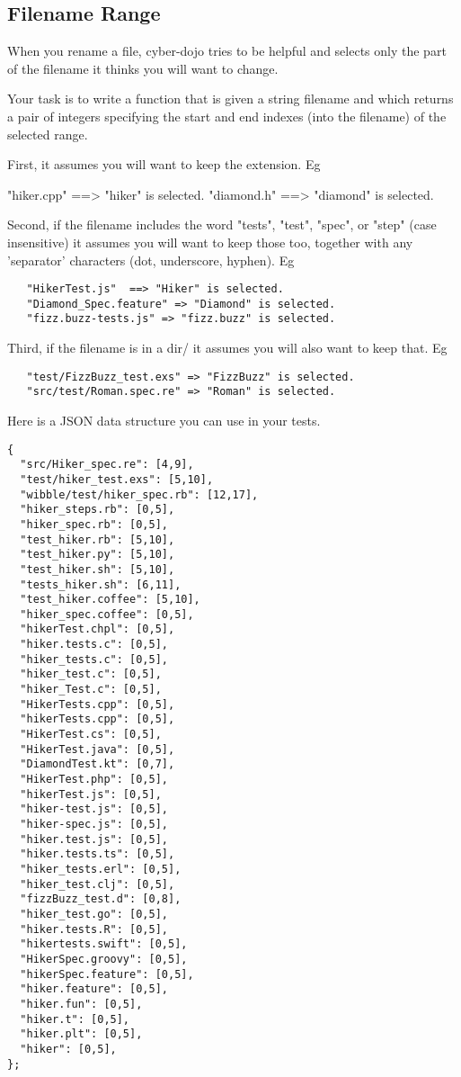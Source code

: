 \subsection{Filename Range}
When you rename a file, cyber-dojo tries to be helpful and selects only the part of the filename it thinks you will want to change.

Your task is to write a function that is given a string filename and which returns a pair of integers specifying the start and end indexes (into the filename) of the selected range.

First, it assumes you will want to keep the extension.
Eg

   "hiker.cpp" ==> "hiker" is selected.
   "diamond.h" ==> "diamond" is selected.

Second, if the filename includes the word "tests", "test", "spec", or
"step" (case insensitive) it assumes you will want to keep those too,
together with any 'separator' characters (dot, underscore, hyphen).
Eg
\begin{verbatim}
   "HikerTest.js"  ==> "Hiker" is selected.
   "Diamond_Spec.feature" => "Diamond" is selected.
   "fizz.buzz-tests.js" => "fizz.buzz" is selected.
\end{verbatim}

Third, if the filename is in a dir/
it assumes you will also want to keep that.
Eg
\begin{verbatim}
   "test/FizzBuzz_test.exs" => "FizzBuzz" is selected.
   "src/test/Roman.spec.re" => "Roman" is selected.
\end{verbatim}

Here is a JSON data structure you can use in your tests.

\begin{verbatim}
{
  "src/Hiker_spec.re": [4,9],
  "test/hiker_test.exs": [5,10],
  "wibble/test/hiker_spec.rb": [12,17],
  "hiker_steps.rb": [0,5],
  "hiker_spec.rb": [0,5],
  "test_hiker.rb": [5,10],
  "test_hiker.py": [5,10],
  "test_hiker.sh": [5,10],
  "tests_hiker.sh": [6,11],
  "test_hiker.coffee": [5,10],
  "hiker_spec.coffee": [0,5],
  "hikerTest.chpl": [0,5],
  "hiker.tests.c": [0,5],
  "hiker_tests.c": [0,5],
  "hiker_test.c": [0,5],
  "hiker_Test.c": [0,5],
  "HikerTests.cpp": [0,5],
  "hikerTests.cpp": [0,5],
  "HikerTest.cs": [0,5],
  "HikerTest.java": [0,5],
  "DiamondTest.kt": [0,7],
  "HikerTest.php": [0,5],
  "hikerTest.js": [0,5],
  "hiker-test.js": [0,5],
  "hiker-spec.js": [0,5],
  "hiker.test.js": [0,5],
  "hiker.tests.ts": [0,5],
  "hiker_tests.erl": [0,5],
  "hiker_test.clj": [0,5],
  "fizzBuzz_test.d": [0,8],
  "hiker_test.go": [0,5],
  "hiker.tests.R": [0,5],
  "hikertests.swift": [0,5],
  "HikerSpec.groovy": [0,5],
  "hikerSpec.feature": [0,5],
  "hiker.feature": [0,5],
  "hiker.fun": [0,5],
  "hiker.t": [0,5],
  "hiker.plt": [0,5],
  "hiker": [0,5],
};
\end{verbatim}
